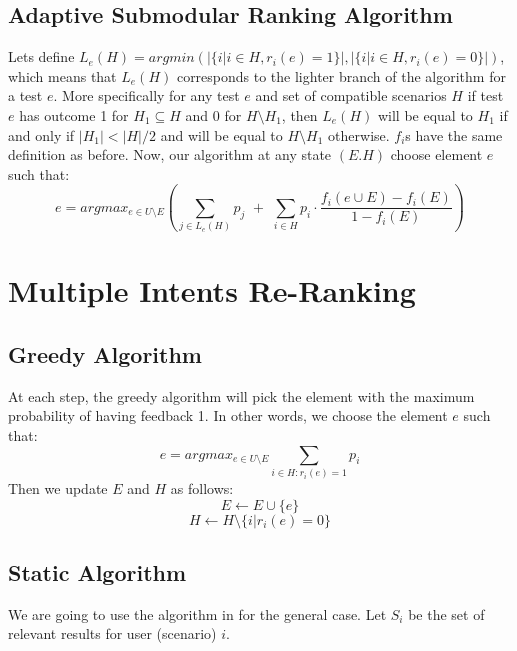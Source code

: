 \documentclass[12pt,epsfig,graphicx,amsmath,color]{article}
\newcommand{\ignore}[1]{}
\begin{document}
\subsection{Adaptive Submodular Ranking Algorithm}
Lets define $L_e(H) = argmin(|\{i|i\in H, r_i(e)=1\}|,|\{i|i\in H, r_i(e)=0\}|)$, which means that $L_e(H)$ corresponds to the lighter branch of the algorithm for a test $e$. More specifically for any test $e$ and set of compatible scenarios $H$ if test $e$ has outcome 1 for $H_1\subseteq H$ and 0 for $H\setminus H_1$, then $L_e(H)$ will be equal to $H_1$ if and only if $|H_1|<|H|/2$ and will be equal to $H\setminus H_1$ otherwise. $f_i$s have the same definition as before. Now, our algorithm at any state $(E.H)$ choose element $e$ such that:
$$e = argmax_{e\in U\setminus E}\left( \sum_{j\in L_e(H)} p_j \,\,+\,\, \sum\limits_{i\in H} p_i \cdot \frac{f_i(e\cup E)-f_i(E)}{1-f_i(E)} \right)$$

\section{Multiple Intents Re-Ranking}
\subsection{Greedy Algorithm}
At each step, the greedy algorithm will pick the element with the maximum probability of having feedback 1. In other words, we choose the element $e$ such that: 
$$e = argmax_{e\in U\setminus E}\sum_{i\in H: r_i(e)=1}p_i$$
Then we update $E$ and $H$ as follows:
$$E\leftarrow E\cup \{e\}$$
$$H\leftarrow H \setminus \{i|r_i(e)=0\}$$
\subsection{Static Algorithm}
We are going to use the algorithm in \cite{AGY09} for the general case. Let $S_i$ be the set of relevant results for user (scenario) $i$.

\begin{algorithm}[H]
\end{algorithm}

\ignore{that we have non-increasing weight. At each step we need to solve the relaxation of the following integer programming:
\begin{gather*}
\begin{aligned}
&\min\sum_{i\in H}y_i \\
y_i&\geq \sum_{e: r_i(e)=1}x_{\pi(e)}&\forall i\in H, \forall \pi\in \Pi\\
\sum_{e\in E'}x_e&\geq (|E'|+{|E'|}^2)/2&\forall E'\subseteq U\\
y_i&\in R^+&\forall i\in H\\
x_e&\in N&\forall e\in E
\end{aligned}
\end{gather*}}
\end{document}

